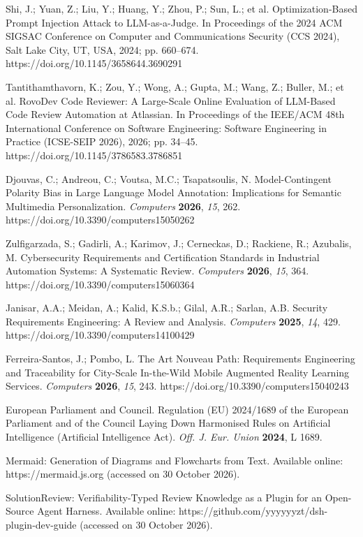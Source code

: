 Shi, J.; Yuan, Z.; Liu, Y.; Huang, Y.; Zhou, P.; Sun, L.; et al. Optimization-Based Prompt Injection Attack to LLM-as-a-Judge. In Proceedings of the 2024 ACM SIGSAC Conference on Computer and Communications Security (CCS 2024), Salt Lake City, UT, USA, 2024; pp. 660--674. https://doi.org/10.1145/3658644.3690291

Tantithamthavorn, K.; Zou, Y.; Wong, A.; Gupta, M.; Wang, Z.; Buller, M.; et al. RovoDev Code Reviewer: A Large-Scale Online Evaluation of LLM-Based Code Review Automation at Atlassian. In Proceedings of the IEEE/ACM 48th International Conference on Software Engineering: Software Engineering in Practice (ICSE-SEIP 2026), 2026; pp. 34--45. https://doi.org/10.1145/3786583.3786851

Djouvas, C.; Andreou, C.; Voutsa, M.C.; Tsapatsoulis, N. Model-Contingent Polarity Bias in Large Language Model Annotation: Implications for Semantic Multimedia Personalization. {\em Computers} {\bf 2026}, {\em 15}, 262. https://doi.org/10.3390/computers15050262

Zulfigarzada, S.; Gadirli, A.; Karimov, J.; Cerneckas, D.; Rackiene, R.; Azubalis, M. Cybersecurity Requirements and Certification Standards in Industrial Automation Systems: A Systematic Review. {\em Computers} {\bf 2026}, {\em 15}, 364. https://doi.org/10.3390/computers15060364

Janisar, A.A.; Meidan, A.; Kalid, K.S.b.; Gilal, A.R.; Sarlan, A.B. Security Requirements Engineering: A Review and Analysis. {\em Computers} {\bf 2025}, {\em 14}, 429. https://doi.org/10.3390/computers14100429

Ferreira-Santos, J.; Pombo, L. The Art Nouveau Path: Requirements Engineering and Traceability for City-Scale In-the-Wild Mobile Augmented Reality Learning Services. {\em Computers} {\bf 2026}, {\em 15}, 243. https://doi.org/10.3390/computers15040243

European Parliament and Council. Regulation (EU) 2024/1689 of the European Parliament and of the Council Laying Down Harmonised Rules on Artificial Intelligence (Artificial Intelligence Act). {\em Off. J. Eur. Union} {\bf 2024}, L 1689.

Mermaid: Generation of Diagrams and Flowcharts from Text. Available online: https://mermaid.js.org (accessed on 30 October 2026).

SolutionReview: Verifiability-Typed Review Knowledge as a Plugin for an Open-Source Agent Harness. Available online: https://github.com/yyyyyyzt/dsh-plugin-dev-guide (accessed on 30 October 2026).

